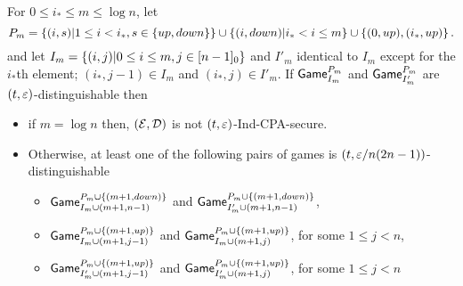 \documentclass{article}
\def\E{{\cal E}}
\def\D{{\cal D}}
\newcommand{\game}{{\sf Game}}
\newcommand{\dgg}[2]{\game_{#1}^{#2}}
\begin{document}
\begin{lemma}
For $0\leq i_*\leq m \leq \log n$, let  $$P_m=\left\{ (i,s)| 1\leq i < i_*, s\in \left\{ up,down \right\} \right\}\cup \left\{ (i,down)| i_*< i \leq m \right\} \cup \left\{ (0,up), (i_*,up) \right\}.$$ and let $I_m=\left\{ (i,j)| 0\leq i \leq m,  j \in[n-1]_0 \right\}$ and $I'_m$ identical to $I_m$ except for the $i_*$th element; $(i_*,j-1)\in I_m$ and $(i_*,j) \in I'_m$. If $\dgg{I_m}{P_m}$ and $\dgg{I'_m}{P_m}$ are $(t,\varepsilon)$-distinguishable then

\begin{itemize}
\item if $m=\log n$ then, $(\E,\D)$ is not $(t, \varepsilon)$-Ind-CPA-secure.
\item Otherwise, 
 at least one of the following pairs of games is $(t,\varepsilon/n(2n-1))$-distinguishable

\begin{itemize}
\item $\dgg{I_m\cup (m+1,n-1)}{P_m\cup \cub{(m+1, down)}}$ and $\dgg{I'_m\cup (m+1,n-1)}{P_m\cup \cub{(m+1, down)}}$,
\item $\dgg{I_m\cup (m+1,j-1)}{P_m\cup \cub{(m+1, up)}}$ and $\dgg{I_m\cup (m+1,j)}{P_m\cup \cub{(m+1, up)}}$, for some  $1\leq j< n$,
\item $\dgg{I'_m\cup (m+1,j-1)}{P_m\cup \cub{(m+1, up)}}$ and $\dgg{I'_m\cup (m+1,j)}{P_m\cup \cub{(m+1, up)}}$, for some  $1\leq j < n$
\end{itemize}
 \end{itemize}
\end{lemma}
\end{document}
